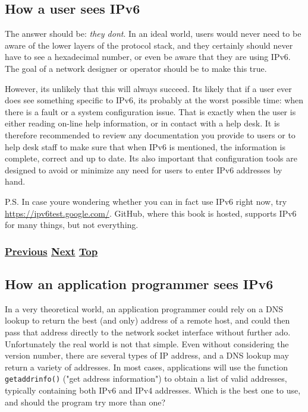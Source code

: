 \documentclass[
]{article}
\begin{document}
\pagebreak

\subsection{How a user sees IPv6}\label{how-a-user-sees-ipv6}

The answer should be: \emph{they don\textquotesingle t}. In an ideal
world, users would never need to be aware of the lower layers of the
protocol stack, and they certainly should never have to see a
hexadecimal number, or even be aware that they are using IPv6. The goal
of a network designer or operator should be to make this true.

However, it\textquotesingle s unlikely that this will always succeed.
It\textquotesingle s likely that if a user ever does see something
specific to IPv6, it\textquotesingle s probably at the worst possible
time: when there is a fault or a system configuration issue. That is
exactly when the user is either reading on-line help information, or in
contact with a help desk. It is therefore recommended to review any
documentation you provide to users or to help desk staff to make sure
that when IPv6 is mentioned, the information is complete, correct and up
to date. It\textquotesingle s also important that configuration tools
are designed to avoid or minimize any need for users to enter IPv6
addresses by hand.

P.S. In case you\textquotesingle re wondering whether you can in fact
use IPv6 right now, try \url{https://ipv6test.google.com/}. GitHub,
where this book is hosted, supports IPv6 for many things, but not
everything.

\subsubsection{\texorpdfstring{\hyperref[how-to-use-this-book]{Previous}
\hyperref[how-an-application-programmer-sees-ipv6]{Next}
\hyperref[introduction-and-foreword]{Top}}{Previous Next Top}}\label{previous-next-top-1}

\pagebreak

\subsection{How an application programmer sees
IPv6}\label{how-an-application-programmer-sees-ipv6}

In a very theoretical world, an application programmer could rely on a
DNS lookup to return the best (and only) address of a remote host, and
could then pass that address directly to the network socket interface
without further ado. Unfortunately the real world is not that simple.
Even without considering the version number, there are several types of
IP address, and a DNS lookup may return a variety of addresses. In most
cases, applications will use the function \texttt{getaddrinfo()} ("get
address information") to obtain a list of valid addresses, typically
containing both IPv6 and IPv4 addresses. Which is the best one to use,
and should the program try more than one?
\end{document}
